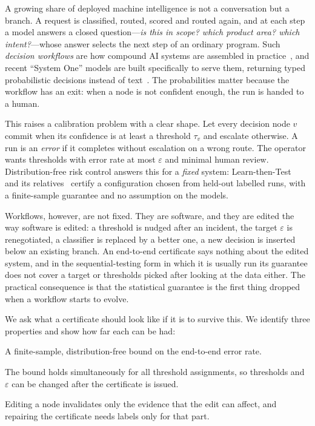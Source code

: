 \documentclass[11pt]{article}
\theoremstyle{definition}
\theoremstyle{remark}
\newcommand{\eps}{\varepsilon}
\begin{document}
A growing share of deployed machine intelligence is not a conversation but a branch. A request
is classified, routed, scored and routed again, and at each step a model answers a closed
question---\emph{is this in scope? which product area? which intent?}---whose answer selects
the next step of an ordinary program. Such \emph{decision workflows} are how compound AI
systems are assembled in practice~\citep{khattab2023dspy}, and recent ``System One'' models
are built specifically to serve them, returning typed probabilistic decisions instead of
text~\citep{typesafe2026jev}. The probabilities matter because the workflow has an exit: when a
node is not confident enough, the run is handed to a human.

This raises a calibration problem with a clear shape. Let every decision node $v$ commit when
its confidence is at least a threshold $\tau_v$ and escalate otherwise. A run is an
\emph{error} if it completes without escalation on a wrong route. The operator wants
thresholds with error rate at most $\eps$ and minimal human review. Distribution-free risk
control answers this for a \emph{fixed} system: Learn-then-Test~\citep{angelopoulos2021ltt} and
its relatives~\citep{bates2021rcps,angelopoulos2022crc,laufer2022pareto} certify a
configuration chosen from held-out labelled runs, with a finite-sample guarantee and no
assumption on the models.

Workflows, however, are not fixed. They are software, and they are edited the way software is
edited: a threshold is nudged after an incident, the target $\eps$ is renegotiated, a
classifier is replaced by a better one, a new decision is inserted below an existing branch.
An end-to-end certificate says nothing about the edited system, and in the sequential-testing
form in which it is usually run its guarantee does not cover a target or thresholds picked
after looking at the data either. The practical consequence is
that the statistical guarantee is the first thing dropped when a workflow starts to evolve.

We ask what a certificate should look like if it is to survive this. We identify three
properties and show how far each can be had:

\begin{description}[leftmargin=1.5em,itemsep=2pt,topsep=3pt]
\item[Validity.] A finite-sample, distribution-free bound on the end-to-end error rate.
\item[Post hoc tunability.] The bound holds simultaneously for all threshold assignments, so
thresholds and $\eps$ can be changed after the certificate is issued.
\item[Edit locality.] Editing a node invalidates only the evidence that the edit can affect,
and repairing the certificate needs labels only for that part.
\end{description}
\end{document}
